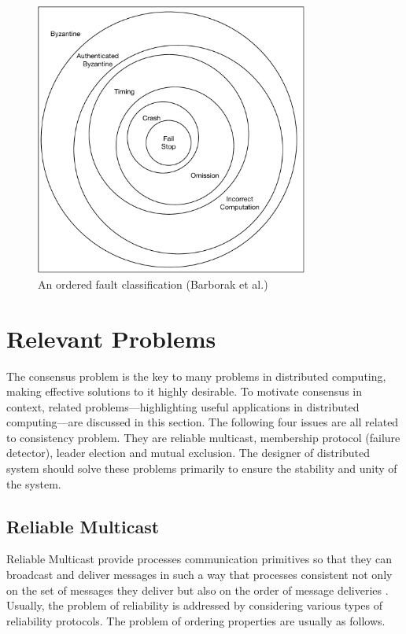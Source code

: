 \documentclass[12pt, a4paper]{article}
\begin{document}
\begin{figure}[htp]
  \centering
  \includegraphics[width=0.8\textwidth]{img/AOFC.pdf}
  \caption{An ordered fault classification (Barborak et al.)}
  \label{fig:aofc}
\end{figure}


\section{Relevant Problems} \label{sec:relevant-problems}

The consensus problem is the key to many problems in distributed computing, 
making effective solutions to it highly desirable\cite{fritzke2001consensus}. To 
motivate consensus in context, related problems—highlighting useful applications 
in distributed computing—are discussed in this section. The following four 
issues are all related to consistency problem. They are reliable multicast, 
membership protocol (failure detector), leader election and mutual exclusion. 
The designer of distributed system should solve these problems primarily to 
ensure the stability and unity of the system.

\subsection{Reliable Multicast}

Reliable Multicast provide processes communication primitives so that they can 
broadcast and deliver messages in such a way that processes consistent not only 
on the set of messages they deliver but also on the order of message deliveries
\cite{fritzke2001consensus}. Usually, the problem of reliability is addressed by 
considering various types of reliability protocols. The problem of ordering 
properties are usually as follows.\cite{garcia1991ordered}
\end{document}

